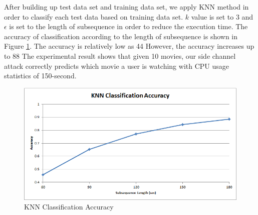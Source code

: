 After building up test data set and training data set, we apply KNN method in order to classify each test data based on training data set. 
$k$ value is set to 3 and $\epsilon$ is set to the length of subsequence in order to reduce the execution time. 
The accuracy of classification according to the length of subsequence is shown in Figure \ref{fig:experiment_knn}.
The accuracy is relatively low as 44%
However, the accuracy increases up to 88%
The experimental result shows that given 10 movies, our side channel attack correctly predicts which movie a user is watching with CPU usage statistics of 150-second.

\begin{figure}[!ht]
\centering
\includegraphics[scale=0.50]{Figures/experiment_knn}
\caption{KNN Classification Accuracy}
\label{fig:experiment_knn}
\end{figure}

